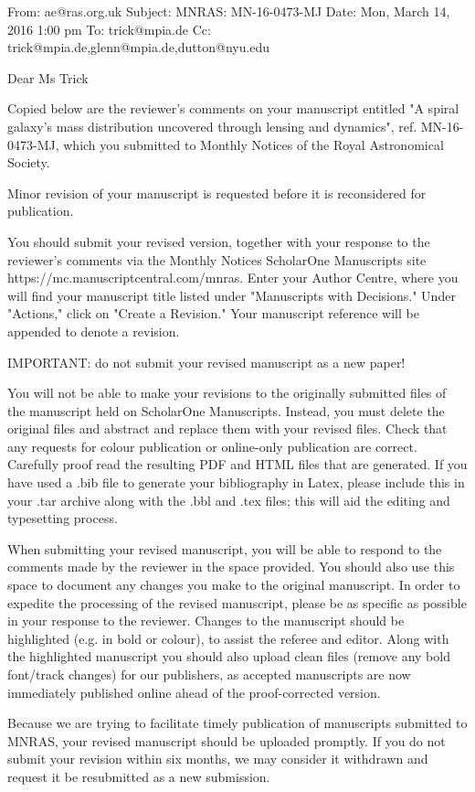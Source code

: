 \documentclass[10pt,a4paper]{article}
\begin{document}
From:  	ae@ras.org.uk
Subject:  	MNRAS: MN-16-0473-MJ
Date:  	Mon, March 14, 2016 1:00 pm
To:  	trick@mpia.de
Cc:  	trick@mpia.de,glenn@mpia.de,dutton@nyu.edu

Dear Ms Trick

Copied below are the reviewer's comments on your manuscript entitled "A spiral
galaxy's mass distribution uncovered through lensing and dynamics", ref.
MN-16-0473-MJ, which you submitted to Monthly Notices of the Royal Astronomical
Society.

Minor revision of your manuscript is requested before it is reconsidered for
publication.

You should submit your revised version, together with your response to the
reviewer's comments via the Monthly Notices ScholarOne Manuscripts site
https://mc.manuscriptcentral.com/mnras.
Enter your Author Centre, where you will find your manuscript title listed under
"Manuscripts with Decisions." Under "Actions," click on "Create a Revision." Your
manuscript reference will be appended to denote a revision.

IMPORTANT: do not submit your revised manuscript as a new paper!

You will not be able to make your revisions to the originally submitted files of the
manuscript held on ScholarOne Manuscripts. Instead, you must delete the original
files and abstract and replace them with your revised files. Check that any requests
for colour publication or online-only publication are correct. Carefully proof read
the resulting PDF and HTML files that are generated. If you have used a .bib file to
generate your bibliography in Latex, please include this in your .tar archive along
with the .bbl and .tex files; this will aid the editing and typesetting process.

When submitting your revised manuscript, you will be able to respond to the comments
made by the reviewer in the space provided. You should also use this space to
document any changes you make to the original manuscript. In order to expedite the
processing of the revised manuscript, please be as specific as possible in your
response to the reviewer. Changes to the manuscript should be highlighted (e.g. in
bold or colour), to assist the referee and editor. Along with the highlighted
manuscript you should also upload clean files (remove any bold font/track changes)
for our publishers, as accepted manuscripts are now immediately published online
ahead of the proof-corrected version.

Because we are trying to facilitate timely publication of manuscripts submitted to
MNRAS, your revised manuscript should be uploaded promptly. If you do not submit
your revision within six months, we may consider it withdrawn and request it be
resubmitted as a new submission.
\end{document}
